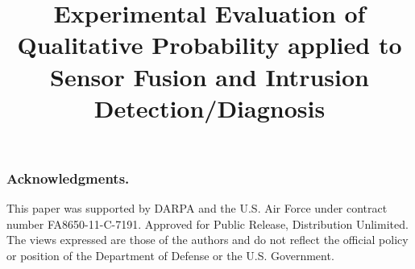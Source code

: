 \documentclass[letterpaper]{article}
\author{\ifthenelse{\boolean{anonymous}}{Anonymous}{Robert P. Goldman and John Maraist}}
\title{Experimental Evaluation of Qualitative Probability applied to Sensor Fusion and Intrusion Detection/Diagnosis}
\begin{document}
\maketitle









\subsubsection*{Acknowledgments.}
\label{sec:acknowledgments}
 
This paper was supported by DARPA and the U.S. Air Force under contract number
FA8650-11-C-7191.
Approved for Public Release, Distribution Unlimited. 
The views expressed are those of the
authors and do not reflect the official policy or position of the Department
of Defense or the U.S. Government.



\end{document}
